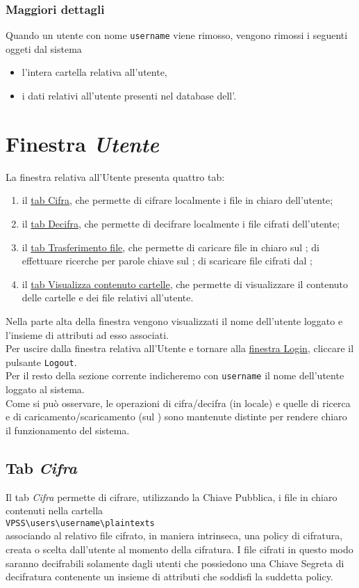 \documentclass[a4paper,twoside,10pt,openany]{scrbook}
\begin{document}
\subsubsection*{Maggiori dettagli}
%
Quando un utente con nome \texttt{username} viene rimosso, vengono rimossi i seguenti oggeti dal sistema
\begin{itemize}
 \item l'intera cartella relativa all'utente,
 \item i dati relativi all'utente presenti nel database dell'\auth.
\end{itemize}
%
\section{Finestra \emph{Utente}}\label{sec:window_user}
%
La finestra relativa all'Utente presenta quattro tab:
\begin{enumerate}
 \item il \hyperref[sec:tab_cifra]{tab Cifra}, che permette di cifrare localmente i file in chiaro dell'utente;
 \item il \hyperref[sec:tab_decifra]{tab Decifra}, che permette di decifrare localmente i file cifrati dell'utente;
 \item il \hyperref[sec:tab_trasferimento]{tab Trasferimento file}, che permette di caricare file in chiaro sul \sa; di effettuare ricerche per parole chiave sul \sa; di scaricare file cifrati dal \sa;
 \item il \hyperref[sec:tab_visualizza]{tab Visualizza contenuto cartelle}, che permette di visualizzare il contenuto delle cartelle e dei file relativi all'utente.
\end{enumerate}
%
Nella parte alta della finestra vengono visualizzati il nome dell'utente loggato e l'insieme di attributi ad esso associati.\\
Per uscire dalla finestra relativa all'Utente e tornare alla \hyperref[sec:window_login]{finestra Login}, cliccare il pulsante \texttt{Logout}.\\
Per il resto della sezione corrente indicheremo con \texttt{username} il nome dell'utente loggato al sistema.\\
%
Come si può osservare, le operazioni di cifra/decifra (in locale) e quelle di ricerca e di caricamento/scaricamento (sul \sa) sono mantenute distinte per rendere chiaro il funzionamento del sistema.
\subsection{Tab \emph{Cifra}}\label{sec:tab_cifra}
%
Il tab \emph{Cifra} permette di cifrare, utilizzando la Chiave Pubblica, i file in chiaro contenuti nella cartella\\
\texttt{VPSS\textbackslash users\textbackslash username\textbackslash plaintexts}\\
associando al relativo file cifrato, in maniera intrinseca, una policy di cifratura, 
creata o scelta dall'utente al momento della cifratura. 
I file cifrati in questo modo saranno decifrabili solamente dagli utenti che possiedono una Chiave Segreta di decifratura contenente un insieme di attributi che soddisfi la suddetta policy.\\
%
\end{document}
